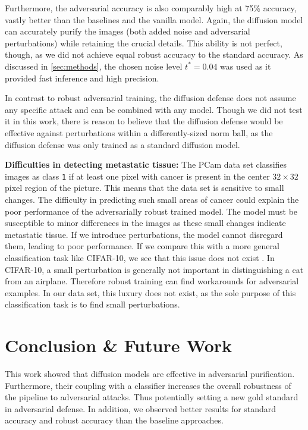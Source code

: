 Furthermore, the adversarial accuracy is also comparably high at 75\% accuracy, vastly better than the baselines and the vanilla model. Again, the diffusion model can accurately purify the images (both added noise and adversarial perturbations) while retaining the crucial details. This ability is not perfect, though, as we did not achieve equal robust accuracy to the standard accuracy. As discussed in \autoref{sec:methods}, the chosen noise level $t^*=0.04$ was used as it provided fast inference and high precision.

In contrast to robust adversarial training, the diffusion defense does not assume any specific attack and can be combined with any model. Though we did not test it in this work, there is reason to believe that the diffusion defense would be effective against perturbations within a differently-sized norm ball, as the diffusion defense was only trained as a standard diffusion model.


\textbf{Difficulties in detecting metastatic tissue:}
The PCam data set classifies images as class \texttt{1} if at least one pixel with cancer is present in the center $32\times 32$ pixel region of the picture. This means that the data set is sensitive to small changes. The difficulty in predicting such small areas of cancer could explain the poor performance of the adversarially robust trained model. The model must be susceptible to minor differences in the images as these small changes indicate metastatic tissue. If we introduce perturbations, the model cannot disregard them, leading to poor performance. If we compare this with a more general classification task like CIFAR-10, we see that this issue does not exist \cite{DiffPure}. In CIFAR-10, a small perturbation is generally not important in distinguishing a cat from an airplane. Therefore robust training can find workarounds for adversarial examples. In our data set, this luxury does not exist, as the sole purpose of this classification task is to find small perturbations. 


\section{Conclusion \& Future Work}
This work showed that diffusion models are effective in adversarial purification. Furthermore, their coupling with a classifier increases the overall robustness of the pipeline to adversarial attacks. Thus potentially setting a new gold standard in adversarial defense. In addition, we observed better results for standard accuracy and robust accuracy than the baseline approaches.

